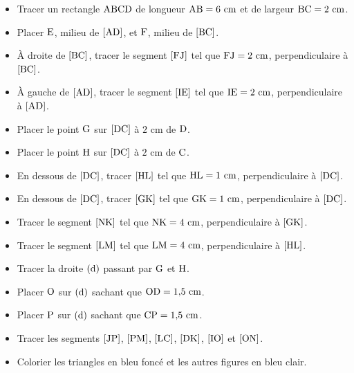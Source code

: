 \documentclass{article}
\begin{document}
\begin{itemize}
    \item Tracer un rectangle $\text{ABCD}$ de longueur
    $\text{AB}=6\text{ cm}$ et de largeur $\text{BC}=2\text{ cm}$.
    \item Placer $\text{E}$, milieu de $[\text{AD}]$, et
    $\text{F}$, milieu de $[\text{BC}]$.
    \item À droite de $[\text{BC}]$, tracer le segment
    $[\text{FJ}]$ tel que $\text{FJ}=2\text{ cm}$,
    perpendiculaire à $[\text{BC}]$.
    \item À gauche de $[\text{AD}]$, tracer le segment
    $[\text{IE}]$ tel que $\text{IE}=2\text{ cm}$,
    perpendiculaire à $[\text{AD}]$.
    \item Placer le point $\text{G}$ sur $[\text{DC}]$ à
    $2\text{ cm}$ de $\text{D}$.
    \item Placer le point $\text{H}$ sur $[\text{DC}]$ à
    $2\text{ cm}$ de $\text{C}$.
    \item En dessous de $[\text{DC}]$, tracer $[\text{HL}]$ tel
    que $\text{HL}=1\text{ cm}$, perpendiculaire à $[\text{DC}]$.
    \item En dessous de $[\text{DC}]$, tracer $[\text{GK}]$ tel
    que $\text{GK}=1\text{ cm}$, perpendiculaire à $[\text{DC}]$.
    \item Tracer le segment $[\text{NK}]$ tel que
    $\text{NK}=4\text{ cm}$, perpendiculaire à $[\text{GK}]$.
    \item Tracer le segment $[\text{LM}]$ tel que
    $\text{LM}=4\text{ cm}$, perpendiculaire à $[\text{HL}]$.
    \item Tracer la droite $(\text{d})$ passant par
    $\text{G}$ et $\text{H}$.
    \item Placer $\text{O}$ sur $(\text{d})$ sachant que
    $\text{OD}=1{,}5\text{ cm}$.
    \item Placer $\text{P}$ sur $(\text{d})$ sachant que
    $\text{CP}=1{,}5\text{ cm}$.
    \item Tracer les segments $[\text{JP}]$, $[\text{PM}]$,
    $[\text{LC}]$, $[\text{DK}]$, $[\text{IO}]$ et
    $[\text{ON}]$.
    \item Colorier les triangles en bleu foncé et les autres figures en
    bleu clair.
\end{itemize}
\end{document}
